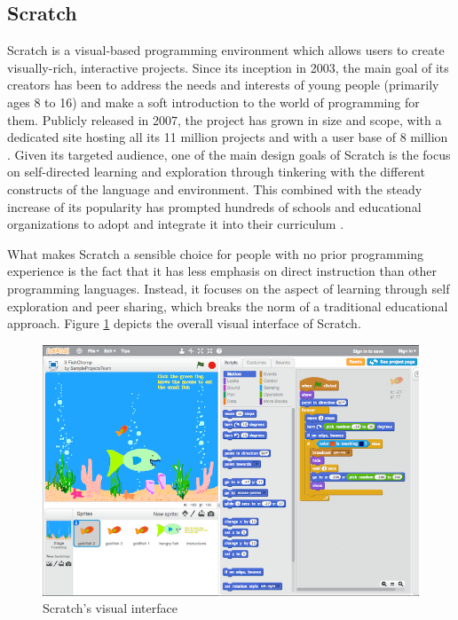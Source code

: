 \subsection{Scratch}
Scratch is a visual-based programming environment which allows users to create visually-rich, interactive projects.  Since its inception in 2003, the main goal of its creators has been to address the needs and interests of young people (primarily ages 8 to 16) and make a soft introduction to the world of programming for them. Publicly released in 2007, the project has grown in size and scope, with a dedicated site hosting all its 11 million projects and with a user base of 8 million \cite{scratchstat}.
Given its targeted audience, one of the main design goals of Scratch is the focus on self-directed learning and exploration through tinkering with the different constructs of the language and environment. This combined with the steady increase of its popularity has prompted hundreds of schools and educational organizations to adopt and integrate it into their curriculum \cite{MaloneyResnick10}.

What makes Scratch a sensible choice for people with no prior programming experience is the fact that it has less emphasis on direct instruction than other programming languages. Instead, it focuses on the aspect of learning through self exploration and peer sharing, which breaks the norm of a traditional educational approach. Figure \ref{fig:scratch_environment} depicts the overall visual interface of Scratch.

\begin{figure}[H]
\begin{center}
\includegraphics[scale=0.85]{./pics/scratch_ui.png}
\caption{Scratch's visual interface\protect\footnotemark}
\label{fig:scratch_environment}
\end{center}
\end{figure}

